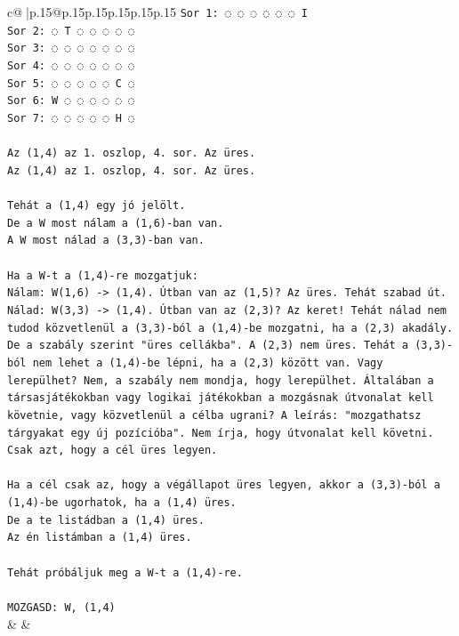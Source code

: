 \documentclass{article}
\begin{document}
{\begin{supertabular}{c@{$\;$}|p{.15\linewidth}@{}p{.15\linewidth}p{.15\linewidth}p{.15\linewidth}p{.15\linewidth}p{.15\linewidth}}
{{{\texttt{Sor 1: ◌ ◌ ◌ ◌ ◌ ◌ I} \\
\texttt{Sor 2: ◌ T ◌ ◌ ◌ ◌ ◌} \\
\texttt{Sor 3: ◌ ◌ ◌ ◌ ◌ ◌ ◌} \\
\texttt{Sor 4: ◌ ◌ ◌ ◌ ◌ ◌ ◌} \\
\texttt{Sor 5: ◌ ◌ ◌ ◌ ◌ C ◌} \\
\texttt{Sor 6: W ◌ ◌ ◌ ◌ ◌ ◌} \\
\texttt{Sor 7: ◌ ◌ ◌ ◌ ◌ H ◌} \\
\\ 
\texttt{Az (1,4) az 1. oszlop, 4. sor. Az üres.} \\
\texttt{Az (1,4) az 1. oszlop, 4. sor. Az üres.} \\
\\ 
\texttt{Tehát a (1,4) egy jó jelölt.} \\
\texttt{De a W most nálam a (1,6){-}ban van.} \\
\texttt{A W most nálad a (3,3){-}ban van.} \\
\\ 
\texttt{Ha a W{-}t a (1,4){-}re mozgatjuk:} \\
\texttt{Nálam: W(1,6) {-}> (1,4). Útban van az (1,5)? Az üres. Tehát szabad út.} \\
\texttt{Nálad: W(3,3) {-}> (1,4). Útban van az (2,3)? Az keret! Tehát nálad nem tudod közvetlenül a (3,3){-}ból a (1,4){-}be mozgatni, ha a (2,3) akadály. De a szabály szerint "üres cellákba". A (2,3) nem üres. Tehát a (3,3){-}ból nem lehet a (1,4){-}be lépni, ha a (2,3) között van. Vagy lerepülhet? Nem, a szabály nem mondja, hogy lerepülhet. Általában a társasjátékokban vagy logikai játékokban a mozgásnak útvonalat kell követnie, vagy közvetlenül a célba ugrani? A leírás: "mozgathatsz tárgyakat egy új pozícióba". Nem írja, hogy útvonalat kell követni. Csak azt, hogy a cél üres legyen.} \\
\\ 
\texttt{Ha a cél csak az, hogy a végállapot üres legyen, akkor a (3,3){-}ból a (1,4){-}be ugorhatok, ha a (1,4) üres.} \\
\texttt{De a te listádban a (1,4) üres.} \\
\texttt{Az én listámban a (1,4) üres.} \\
\\ 
\texttt{Tehát próbáljuk meg a W{-}t a (1,4){-}re.} \\
\\ 
\texttt{MOZGASD: W, (1,4)} \\
            }
        }
    }
    & & \\ \\


\end{supertabular}}
\end{document}
